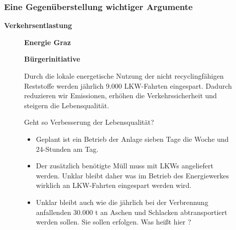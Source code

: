 \documentclass[8pt]{beamer}
\begin{document}
	\begin{frame}[t]
		\frametitle{Eine Gegenüberstellung wichtiger Argumente} 
		\textbf{Verkehrsentlastung}
		\begin{figure}[htbp]
			\begin{minipage}[t]{0.38\textwidth}
				\textbf{Energie Graz}
			\end{minipage}
			\hfill
			\begin{minipage}[t]{0.58\textwidth}
				\textbf{Bürgerinitiative}
			\end{minipage}
		\end{figure}
		\begin{figure}[htbp]
			\begin{minipage}[t]{0.38\textwidth}
				\begin{framed}
					Durch die lokale energetische Nutzung der nicht recyclingfähigen Reststoffe werden jährlich 9.000 LKW-Fahrten eingespart. Dadurch reduzieren wir Emissionen, erhöhen die Verkehrssicherheit und steigern die Lebensqualität.				
				\end{framed}
			\end{minipage}
			\hfill
			\begin{minipage}[t]{0.58\textwidth}
				\begin{framed}
				Geht so Verbesserung der Lebensqualität?
                                        \begin{itemize}
                                                \item Geplant ist ein Betrieb der Anlage sieben Tage die Woche und 24-Stunden am Tag.
                                                \item Der zusätzlich benötigte Müll muss mit LKWs angeliefert werden. Unklar bleibt daher was im Betrieb des Energiewerkes wirklich an LKW-Fahrten eingespart werden wird.
                                                \item Unklar bleibt auch wie die jährlich  bei der Verbrennung anfallenden 30.000 t an Aschen und Schlacken abtransportiert werden sollen. Sie sollen  erfolgen. Was heißt hier ?
                                               
                                         
                        \end{itemize}
				\end{framed}
			\end{minipage}
		\end{figure}
	\end{frame}		
\end{document}
